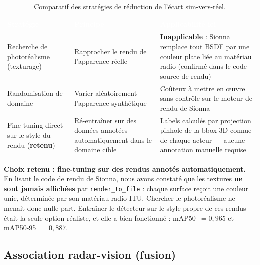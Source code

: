 \documentclass[12pt,a4paper,titlepage]{article}
\newcommand{\hd}[1]{\textcolor{white}{\textbf{#1}}}
\newcommand{\choix}{\rowcolor{tabchoice}}
\begin{document}
\begin{table}[H]
    \centering
    \caption{Comparatif des stratégies de réduction de l'écart sim-vers-réel.}
    \begin{tabularx}{\textwidth}{F{3.6cm}LL}
        \toprule
        \hd{Stratégie} & \hd{Principe} & \hd{Applicabilité ici} \\
        \midrule
        Recherche de photoréalisme (texturage) & Rapprocher le rendu de l'apparence réelle & \textbf{Inapplicable} : Sionna remplace tout BSDF par une couleur plate liée au matériau radio (confirmé dans le code source de rendu) \\
        Randomisation de domaine & Varier aléatoirement l'apparence synthétique & Coûteux à mettre en \oe uvre sans contrôle sur le moteur de rendu de Sionna \\
        \choix Fine-tuning direct sur le style du rendu (\textbf{retenu}) & Ré-entraîner sur des données annotées automatiquement dans le domaine cible & Labels calculés par projection pinhole de la bbox 3D connue de chaque acteur --- aucune annotation manuelle requise \\
        \bottomrule
    \end{tabularx}
\end{table}

\textbf{Choix retenu : fine-tuning sur des rendus annotés automatiquement.} En lisant le code de rendu de Sionna, nous avons constaté que les textures \textbf{ne sont jamais affichées} par \texttt{render\_to\_file} : chaque surface reçoit une couleur unie, déterminée par son matériau radio ITU. Chercher le photoréalisme ne menait donc nulle part. Entraîner le détecteur sur le style propre de ces rendus était la seule option réaliste, et elle a bien fonctionné : mAP50~$=0{,}965$ et mAP50-95~$=0{,}887$.

\subsection{Association radar-vision (fusion)}
\label{subsec:choix_tech_fusion}
\end{document}

